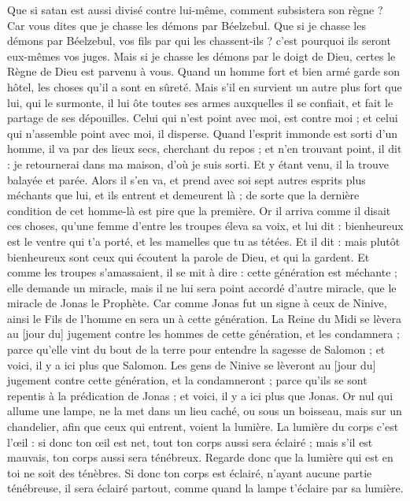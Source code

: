 \begin{multicols}{2}
Que si satan est aussi divisé contre lui-même, comment subsistera son règne ? Car vous dites que je chasse les démons par Béelzebul.
Que si je chasse les démons par Béelzebul, vos fils par qui les chassent-ils ? c'est pourquoi ils seront eux-mêmes vos juges.
Mais si je chasse les démons par le doigt de Dieu, certes le Règne de Dieu est parvenu à vous.
Quand un homme fort et bien armé garde son hôtel, les choses qu'il a sont en sûreté.
Mais s'il en survient un autre plus fort que lui, qui le surmonte, il lui ôte toutes ses armes auxquelles il se confiait, et fait le partage de ses dépouilles.
Celui qui n'est point avec moi, est contre moi ; et celui qui n'assemble point avec moi, il disperse.
Quand l'esprit immonde est sorti d'un homme, il va par des lieux secs, cherchant du repos ; et n'en trouvant point, il dit : je retournerai dans ma maison, d'où je suis sorti.
Et y étant venu, il la trouve balayée et parée.
Alors il s'en va, et prend avec soi sept autres esprits plus méchants que lui, et ils entrent et demeurent là ; de sorte que la dernière condition de cet homme-là est pire que la première.
Or il arriva comme il disait ces choses, qu'une femme d'entre les troupes éleva sa voix, et lui dit : bienheureux est le ventre qui t'a porté, et les mamelles que tu as tétées.
Et il dit : mais plutôt bienheureux sont ceux qui écoutent la parole de Dieu, et qui la gardent.
Et comme les troupes s'amassaient, il se mit à dire : cette génération est méchante ; elle demande un miracle, mais il ne lui sera point accordé d'autre miracle, que le miracle de Jonas le Prophète.
Car comme Jonas fut un signe à ceux de Ninive, ainsi le Fils de l'homme en sera un à cette génération.
La Reine du Midi se lèvera au [jour du] jugement contre les hommes de cette génération, et les condamnera ; parce qu'elle vint du bout de la terre pour entendre la sagesse de Salomon ; et voici, il y a ici plus que Salomon.
Les gens de Ninive se lèveront au [jour du] jugement contre cette génération, et la condamneront ; parce qu'ils se sont repentis à la prédication de Jonas ; et voici, il y a ici plus que Jonas.
Or nul qui allume une lampe, ne la met dans un lieu caché, ou sous un boisseau, mais sur un chandelier, afin que ceux qui entrent, voient la lumière.
La lumière du corps c'est l'œil : si donc ton œil est net, tout ton corps aussi sera éclairé ; mais s'il est mauvais, ton corps aussi sera ténébreux.
Regarde donc que la lumière qui est en toi ne soit des ténèbres.
Si donc ton corps est éclairé, n'ayant aucune partie ténébreuse, il sera éclairé partout, comme quand la lampe t'éclaire par sa lumière.

\end{multicols}
